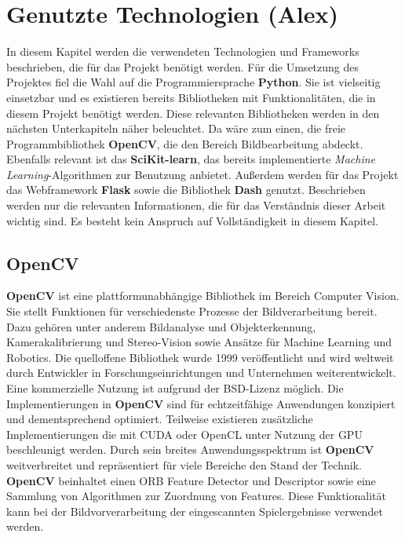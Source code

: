\section{Genutzte Technologien (Alex)}
In diesem Kapitel werden die verwendeten Technologien und Frameworks beschrieben, die für das Projekt benötigt werden.
Für die Umsetzung des Projektes fiel die Wahl auf die Programmiersprache \textbf{Python}. Sie ist vielseitig einsetzbar und es existieren bereits Bibliotheken mit
Funktionalitäten, die in diesem Projekt benötigt werden. Diese relevanten Bibliotheken werden in den nächsten Unterkapiteln näher beleuchtet.
Da wäre zum einen, die freie Programmbibliothek \textbf{OpenCV}, die den Bereich Bildbearbeitung abdeckt. Ebenfalls relevant ist das \textbf{SciKit-learn}, das 
bereits implementierte \textit{Machine Learning}-Algorithmen zur Benutzung anbietet. Außerdem werden für das Projekt das Webframework \textbf{Flask} sowie
die Bibliothek \textbf{Dash} genutzt. Beschrieben werden nur die relevanten Informationen, die für das Verständnis dieser Arbeit wichtig sind. 
Es besteht kein Anspruch auf Vollständigkeit in diesem Kapitel.

\subsection{OpenCV}
\textbf{OpenCV} ist eine plattformunabhängige Bibliothek im Bereich Computer Vision. Sie stellt Funktionen für verschiedenste Prozesse der Bildverarbeitung bereit.
Dazu gehören unter anderem Bildanalyse und Objekterkennung, Kamerakalibrierung und Stereo-Vision sowie Ansätze für Machine Learning und Robotics.
Die quelloffene Bibliothek wurde 1999 veröffentlicht und wird weltweit durch Entwickler in Forschungseinrichtungen und Unternehmen weiterentwickelt. 
Eine kommerzielle Nutzung ist aufgrund der BSD-Lizenz möglich. Die Implementierungen in \textbf{OpenCV} sind für echtzeitfähige Anwendungen konzipiert 
und dementsprechend optimiert. 
Teilweise existieren zusätzliche Implementierungen die mit CUDA oder OpenCL unter Nutzung der GPU beschleunigt werden.
Durch sein breites Anwendungsspektrum ist \textbf{OpenCV} weitverbreitet und repräsentiert für viele Bereiche den Stand der Technik. 
\textbf{OpenCV} beinhaltet einen ORB Feature Detector und Descriptor sowie eine Sammlung von Algorithmen zur Zuordnung von Features.
Diese Funktionalität kann bei der Bildvorverarbeitung der eingescannten Spielergebnisse verwendet werden.

